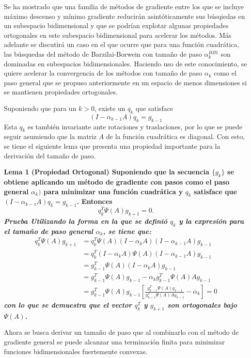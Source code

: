 \par Se ha mostrado que una familia de métodos de gradiente entre los que se incluye máximo descenso y mínimo gradiente reducirán asintóticamente sus búsqiedas en un subespacio bidimensional y que se podrían explotar algunas propiedades ortogonales en este subespacio bidimensional para acelerar los métodos. Más adelante se discutirá un caso en el que ocurre que para una función cuadrática, las búsquedas del método de Barzilai-Borwein con tamaño de paso $\alpha_k^{BB1}$ son dominadas en subespacios bidimensionales. Haciendo uso de este conocimiento, se quiere acelerar la convergencia de los métodos con tamaño de paso $\alpha_k$ como el paso general que se propuso anteriormente en un espacio de menos dimensiones si se mantienen propiedades ortogonales.
\par Suponiendo que para un $k>0$, existe un $q_k$ que satisface
$$
	(I-\alpha_{k-1}A)q_k = g_{k-1}
$$
Esta $q_k$ es también invariante ante rotaciones y traslaciones, por lo que se puede seguir asumiendo que la matriz $A$ de la función cuadrática es diagonal. Con esto, se tiene el siguiente lema que presenta una propiedad importante para la derivación del tamaño de paso.\par
\bf Lema 1 (Propiedad Ortogonal) \normalfont Suponiendo que la secuencia $\{g_k\}$ se obtiene aplicando un método de gradiente con pasos como el paso general $\alpha_k)$ para minimizar una función cuadrática y $q_k$ satisface que $(I-\alpha_{k-1}A)q_k = g_{k-1}$. Entonces
$$
	q_k^T\Psi(A)g_{k+1} = 0.
$$
\it Prueba \normalfont Utilizando la forma en la que se definió $q_k$ y la expresión para el tamaño de paso general $\alpha_k$, se tiene que:
\begin{align*}
	q_k^T \Psi(A)g_{k+1} &= q_k^T\Psi(A)(I-\alpha_kA)(I-\alpha_{k-1}A)g_{k-1}\\
	&= q_k^T(I-\alpha_kA)\Psi(A)(I-\alpha_{k-1}A)g_{k-1}\\
	&= g_{k-1}^T\Psi(A)(I-\alpha_kA)g_{k-1}\\
	&=g_{k-1}^T\Psi(A)g_{k-1}-\alpha_kg_{k-1}^T\Psi(A)Ag_{k-1}\\
	&=g_{k-1}^T\Psi(A)g_{k-1}\left[\frac{g_{k-1}^T\Psi(A)g_{k-1}}{g_{k-1}^T\Psi(A)Ag_{k-1}}-\alpha_k\right] = 0
\end{align*}
con lo que se demuestra que el vector $q_k^T$ y $g_{k+1}$ son ortogonales bajo $\Psi(A)$.
\par Ahora se busca derivar un tamaño de paso que al combinarlo con el método de gradiente general se puede alcanzar una terminación finita para minimizar funciones bidimensionales fuertemente convexas.
